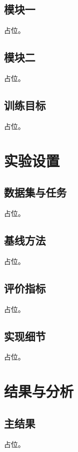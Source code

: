 \documentclass[UTF8,twocolumn]{ctexart}
\begin{document}
\subsection{模块一}

占位。

\subsection{模块二}

占位。

\subsection{训练目标}

占位。

\section{实验设置}

\subsection{数据集与任务}

占位。

\subsection{基线方法}

占位。

\subsection{评价指标}

占位。

\subsection{实现细节}

占位。

\section{结果与分析}

\subsection{主结果}

占位。
\end{document}
